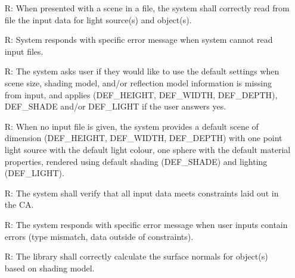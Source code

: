 \documentclass[12pt, titlepage]{article}
\newcounter{reqnum} %
\begin{document}
\begin{itemize}
	\item[R\refstepcounter{reqnum}\thereqnum \label{R_Inputs1}:] When presented 
	with a scene in a file, the system shall correctly read from file the 
	input data for light source(s) and object(s).
	
	\item[R\refstepcounter{reqnum}\thereqnum \label{R_Inputs1Err}:]System 
	responds with specific error message when system cannot read input files.
	
	\item[R\refstepcounter{reqnum}\thereqnum \label{R_Inputs1Err-Def}:]	The 
	system asks user if they would like to use the default settings when scene 
	size, shading model, and/or reflection model information is missing from 
	input, and applies (DEF\_HEIGHT, DEF\_WIDTH, DEF\_DEPTH), DEF\_SHADE and/or 
	DEF\_LIGHT if the user answers yes.
	
	\item[R\refstepcounter{reqnum}\thereqnum \label{R_DefaultScene}:]When no 
	input file is given, the system provides a default scene of dimension 
	(DEF\_HEIGHT, DEF\_WIDTH, DEF\_DEPTH) with one point light source with the 
	default light colour, one sphere with the default material properties, 
	rendered using default shading (DEF\_SHADE) and lighting (DEF\_LIGHT).
	
	\item[R\refstepcounter{reqnum}\thereqnum \label{R_Inputs2}:]The system 
	shall verify that all input data meets constraints laid out in the CA.
	
	\item[R\refstepcounter{reqnum}\thereqnum \label{R_Inputs2Err}:] The system 
	responds with specific error message when user inputs contain errors (type 
	mismatch, data outside of constraints).
	
	\item[R\refstepcounter{reqnum}\thereqnum \label{R_Calculate1}:] The library 
	shall correctly calculate the surface normals for object(s) based on 
	shading model.
	

\end{itemize}
\end{document}
